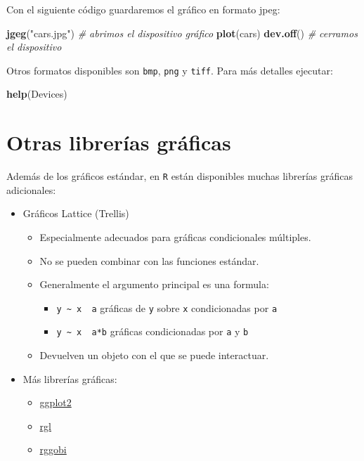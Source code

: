 \documentclass[]{book}
\newenvironment{Shaded}{\begin{snugshade}}{\end{snugshade}}
\newcommand{\KeywordTok}[1]{\textcolor[rgb]{0.13,0.29,0.53}{\textbf{#1}}}
\newcommand{\StringTok}[1]{\textcolor[rgb]{0.31,0.60,0.02}{#1}}
\newcommand{\CommentTok}[1]{\textcolor[rgb]{0.56,0.35,0.01}{\textit{#1}}}
\newcommand{\NormalTok}[1]{#1}
\begin{document}
Con el siguiente código guardaremos el gráfico en formato jpeg:

\begin{Shaded}
\begin{Highlighting}[]
\KeywordTok{jgeg}\NormalTok{(}\StringTok{"cars.jpg"}\NormalTok{)  }\CommentTok{# abrimos el dispositivo gráfico}
\KeywordTok{plot}\NormalTok{(cars)}
\KeywordTok{dev.off}\NormalTok{()         }\CommentTok{# cerramos el dispositivo}
\end{Highlighting}
\end{Shaded}

Otros formatos disponibles son \texttt{bmp}, \texttt{png} y
\texttt{tiff}. Para más detalles ejecutar:

\begin{Shaded}
\begin{Highlighting}[]
\KeywordTok{help}\NormalTok{(Devices)}
\end{Highlighting}
\end{Shaded}

\section{Otras librerías gráficas}\label{otras-librerias-graficas}

Además de los gráficos estándar, en \texttt{R} están disponibles muchas
librerías gráficas adicionales:

\begin{itemize}
\item
  Gráficos Lattice (Trellis)

  \begin{itemize}
  \item
    Especialmente adecuados para gráficas condicionales múltiples.
  \item
    No se pueden combinar con las funciones estándar.
  \item
    Generalmente el argumento principal es una formula:

    \begin{itemize}
    \item
      \texttt{y\ \textasciitilde{}\ x\ \textbar{}\ a} gráficas de
      \texttt{y} sobre \texttt{x} condicionadas por \texttt{a}
    \item
      \texttt{y\ \textasciitilde{}\ x\ \textbar{}\ a*b} gráficas
      condicionadas por \texttt{a} y \texttt{b}
    \end{itemize}
  \item
    Devuelven un objeto con el que se puede interactuar.
  \end{itemize}
\item
  Más librerías gráficas:

  \begin{itemize}
  \item
    \href{http://had.co.nz/ggplot2}{ggplot2}
  \item
    \href{http://rgl.neoscientists.org}{rgl}
  \item
    \href{http://www.ggobi.org/rggobi}{rggobi}
  \end{itemize}
\end{itemize}
\end{document}
